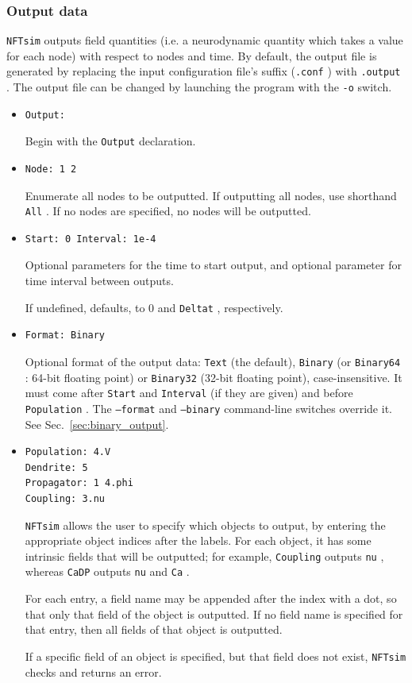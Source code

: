 \documentclass[12pt,a4paper]{article}
\newcommand{\type}[1]{{\small\small\tt #1} }
\newcommand{\NF}[0]{\type{NFTsim}}
\begin{document}
\subsubsection{Output data}
\label{sec:output_conf}

\NF outputs field quantities (i.e. a neurodynamic quantity which takes a value for each node) with respect to nodes and time. By default, the output file is generated by replacing the input configuration file's suffix (\type{.conf}) with \type{.output}. The output file can be changed by launching the program with the \type{-o} switch.

\begin{itemize}
    \item \begin{lstlisting}
Output:
        \end{lstlisting}
Begin with the \type{Output} declaration.
\item \begin{lstlisting}
Node: 1 2
\end{lstlisting}
Enumerate all nodes to be outputted. If outputting all nodes, use shorthand \type{All}. If no nodes are specified, no nodes will be outputted.
\item \begin{lstlisting}
Start: 0 Interval: 1e-4
\end{lstlisting}
Optional parameters for the time to start output, and optional parameter for time interval between outputs.

If undefined, defaults, to 0 and \type{Deltat}, respectively.
\item \begin{lstlisting}
Format: Binary
\end{lstlisting}
Optional format of the output data: \type{Text} (the default), \type{Binary} (or \type{Binary64}: 64-bit floating point) or \type{Binary32} (32-bit floating point), case-insensitive.
It must come after \type{Start} and \type{Interval} (if they are given) and before \type{Population}.
The \type{--format} and \type{--binary} command-line switches override it.
See Sec.~\ref{sec:binary_output}.
\item \begin{lstlisting}
Population: 4.V
Dendrite: 5
Propagator: 1 4.phi
Coupling: 3.nu
\end{lstlisting}

\NF allows the user to specify which objects to output, by entering the appropriate object indices after the labels. For each object, it has some intrinsic fields that will be outputted; for example, \type{Coupling} outputs \type{nu}, whereas \type{CaDP} outputs \type{nu} and \type{Ca}.

For each entry, a field name may be appended after the index with a dot, so that only that field of the object is outputted. If no field name is specified for that entry, then all fields of that object is outputted.

If a specific field of an object is specified, but that field does not exist, \NF checks and returns an error.

\end{itemize}
\end{document}
